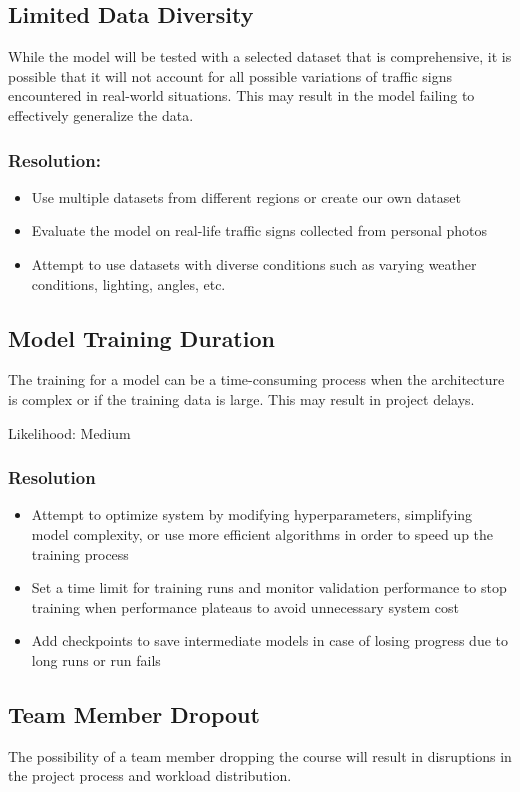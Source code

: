 \documentclass{article} %
\begin{document}
\subsection{Limited Data Diversity}
While the model will be tested with a selected dataset that is comprehensive, it is possible that it will not account for all possible variations of traffic signs encountered in real-world situations. This may result in the model failing to effectively generalize the data.  
\subsubsection*{Resolution:}
\begin{itemize}
    \item Use multiple datasets from different regions or create our own dataset
    \item Evaluate the model on real-life traffic signs collected from personal photos
    \item Attempt to use datasets with diverse conditions such as varying weather conditions, lighting, angles, etc.
\end{itemize}

\subsection{Model Training Duration}
The training for a model can be a time-consuming process when the architecture is complex or if the training data is large. This may result in project delays. 

Likelihood: Medium
\subsubsection*{Resolution}
\begin{itemize}
    \item Attempt to optimize system by modifying hyperparameters, simplifying model complexity, or use more efficient algorithms in order to speed up the training process
    \item Set a time limit for training runs and monitor validation performance to stop training when performance plateaus to avoid unnecessary system cost
    \item Add checkpoints to save intermediate models in case of losing progress due to long runs or run fails
\end{itemize}

\subsection{Team Member Dropout}
The possibility of a team member dropping the course will result in disruptions in the project process and workload distribution.
\end{document}
